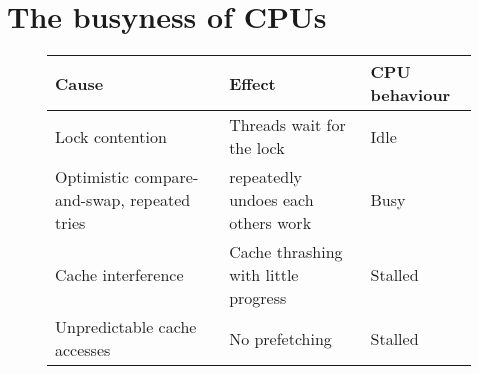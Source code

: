 \chapter{The busyness of CPUs}
\label{chap:busyness}





\begin{figure}
\centering
\begin{tabular}{|p{4cm}|p{4cm}|p{3cm}|}
\hline
Cause & Effect & CPU behaviour \\
\hline
\hline
Lock contention & Threads wait for the lock & Idle \\
\hline
Optimistic compare-and-swap, repeated tries & repeatedly undoes each others work
& Busy \\
\hline
Cache interference & Cache thrashing with little progress & Stalled \\
\hline
Unpredictable cache accesses & No prefetching & Stalled \\
\hline
\end{tabular}
	\caption{}
	\label{table:timewaste}
\end{figure}
